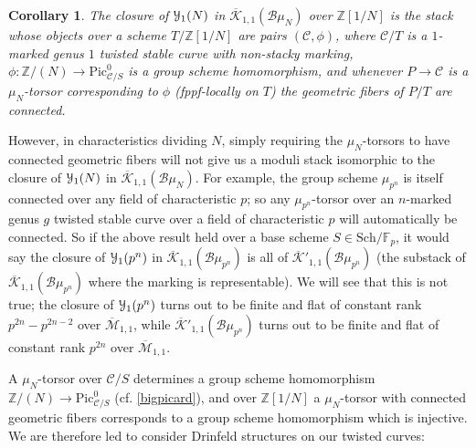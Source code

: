 \documentclass[11pt]{amsart}
\newtheorem{corollary}[subsection]{Corollary}
\theoremstyle{definition}
\begin{document}
\begin{corollary}
The closure of ${\mathbf{\EuScript{Y}}}_1(N)$ in $\overline{\mathcal{K}}_{1,1}({\mathcal{B}} \mu_N)$ over $\mathbb{Z}[1/N]$ is the stack whose objects over a scheme $T/\mathbb{Z}[1/N]$ are pairs $({\mathcal{C}},\phi)$, where ${\mathcal{C}}/T$ is a $1$-marked genus $1$ twisted stable curve with non-stacky marking, $\phi:\mathbb{Z}/(N) \rightarrow \mathrm{Pic}^0_{{\mathcal{C}}/S}$ is a group scheme homomorphism, and whenever $P \rightarrow {\mathcal{C}}$ is a $\mu_N$-torsor corresponding to $\phi$ (fppf-locally on $T$) the geometric fibers of $P/T$ are connected.
\end{corollary}

However, in characteristics dividing $N$, simply requiring the $\mu_N$-torsors to have connected geometric fibers will not give us a moduli stack isomorphic to the closure of ${\mathbf{\EuScript{Y}}}_1(N)$ in $\overline{\mathcal{K}}_{1,1}({\mathcal{B}}\mu_N)$. For example, the group scheme $\mu_{p^n}$ is itself connected over any field of characteristic $p$; so any $\mu_{p^n}$-torsor over an $n$-marked genus $g$ twisted stable curve over a field of characteristic $p$ will automatically be connected. So if the above result held over a base scheme $S \in \mathrm{Sch}/\mathbb{F}_p$, it would say the closure of ${\mathbf{\EuScript{Y}}}_1(p^n)$ in $\overline{\mathcal{K}}_{1,1}({\mathcal{B}}\mu_{p^n})$ is all of $\overline{\mathcal{K}}'_{1,1}({\mathcal{B}}\mu_{p^n})$ (the substack of $\overline{\mathcal{K}}_{1,1}({\mathcal{B}}\mu_{p^n})$ where the marking is representable). We will see that this is not true; the closure of ${\mathbf{\EuScript{Y}}}_1(p^n)$ turns out to be finite and flat of constant rank $p^{2n}-p^{2n-2}$ over $\overline{\mathcal{M}}_{1,1}$, while $\overline{\mathcal{K}}'_{1,1}({\mathcal{B}}\mu_{p^n})$ turns out to be finite and flat of constant rank $p^{2n}$ over $\overline{\mathcal{M}}_{1,1}$.

A $\mu_N$-torsor over ${\mathcal{C}}/S$ determines a group scheme homomorphism $\mathbb{Z}/(N) \rightarrow \mathrm{Pic}^0_{{\mathcal{C}}/S}$ (cf. \ref{bigpicard}), and over $\mathbb{Z}[1/N]$ a $\mu_N$-torsor with connected geometric fibers corresponds to a group scheme homomorphism which is injective. We are therefore led to consider Drinfeld structures on our twisted curves:
\end{document}
